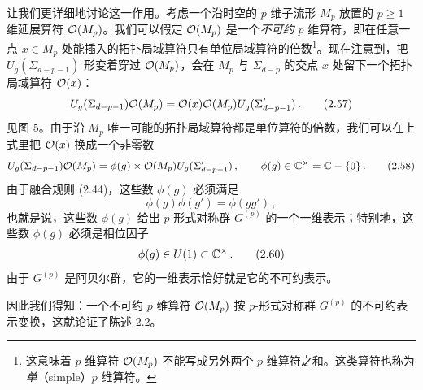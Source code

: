 让我们更详细地讨论这一作用。考虑一个沿时空的 $p$ 维子流形 $M_p$ 放置的 $p\ge1$ 维延展算符 $\mathcal{O}(M_p)$。我们可以假定 $\mathcal{O}(M_p)$ 是一个\emph{不可约} $p$ 维算符，即在任意一点 $x\in M_p$ 处能插入的拓扑局域算符只有单位局域算符的倍数\footnote{这意味着 $p$ 维算符 $\mathcal{O}(M_p)$ 不能写成另外两个 $p$ 维算符之和。这类算符也称为\emph{单}（simple）$p$ 维算符。}。现在注意到，把 $U_g(\Sigma_{d-p-1})$ 形变着穿过 $\mathcal{O}(M_p)$，会在 $M_p$ 与 $\Sigma_{d-p}$ 的交点 $x$ 处留下一个拓扑局域算符 $\mathcal{O}(x)$：
\begin{equation}
  U_g(\Sigma_{d-p-1})\mathcal{O}(M_p) = \mathcal{O}(x)\mathcal{O}(M_p)U_g(\Sigma'_{d-p-1})\,. \tag{2.57}
\end{equation}
见图 5。由于沿 $M_p$ 唯一可能的拓扑局域算符都是单位算符的倍数，我们可以在上式里把 $\mathcal{O}(x)$ 换成一个非零数
\begin{equation}
  U_g(\Sigma_{d-p-1})\mathcal{O}(M_p) = \phi(g)\times\mathcal{O}(M_p)U_g(\Sigma'_{d-p-1})\,, \qquad \phi(g)\in\mathbb{C}^\times = \mathbb{C}-\{0\}\,. \tag{2.58}
\end{equation}
由于融合规则 (2.44)，这些数 $\phi(g)$ 必须满足
\begin{equation}
  \phi(g)\phi(g') = \phi(gg')\,, \tag{2.59}
\end{equation}
也就是说，这些数 $\phi(g)$ 给出 $p$-形式对称群 $G^{(p)}$ 的一个一维表示；特别地，这些数 $\phi(g)$ 必须是相位因子
\begin{equation}
  \phi(g)\in U(1)\subset\mathbb{C}^\times\,. \tag{2.60}
\end{equation}
由于 $G^{(p)}$ 是阿贝尔群，它的一维表示恰好就是它的不可约表示。

因此我们得知：一个不可约 $p$ 维算符 $\mathcal{O}(M_p)$ 按 $p$-形式对称群 $G^{(p)}$ 的不可约表示变换，这就论证了陈述 2.2。

